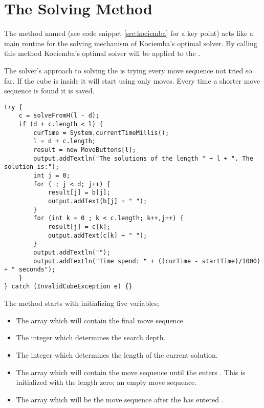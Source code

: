 \section{The Solving Method}
\label{sec:kSolve}
The method named  (see code snippet \ref{src:kociemba} for a key point) acts like a main routine for the solving mechanism of Kociemba's optimal solver. By calling this method Kociemba's optimal solver will be applied to the \rubik{}. 

The solver's approach to solving the \rubik{} is trying every move sequence not tried so far. If the cube is inside  it will start using only  moves. Every time a shorter move sequence is found it is saved. 

\begin{lstlisting}[style=sourceCode, caption=\myCaption{Key point in the solve method of Kociemba's optimal solver}, label=src:kociemba]
try {
	c = solveFromH(l - d);
	if (d + c.length < l) {
		curTime = System.currentTimeMillis();
		l = d + c.length;
		result = new MoveButtons[l];
		output.addTextln("The solutions of the length " + l + ". The solution is:");
		int j = 0;
		for ( ; j < d; j++) {
			result[j] = b[j];
			output.addText(b[j] + " ");
		}
		for (int k = 0 ; k < c.length; k++,j++) {
			result[j] = c[k];
			output.addText(c[k] + " ");
		}
		output.addTextln("");
		output.addTextln("Time spend: " + ((curTime - startTime)/1000) + " seconds");
	}
} catch (InvalidCubeException e) {}
\end{lstlisting}

The  method starts with initializing five variables; 
\begin{itemize}
\item The array  which will contain the final move sequence.
\item The integer  which determines the search depth. 
\item The integer  which determines the length of the current solution. 
\item The array  which will contain the move sequence until the \rubik{} enters . This is initialized with the length zero; an empty move sequence. 
\item The array  which will be the move sequence after the \rubik{} has entered .
\end{itemize}

